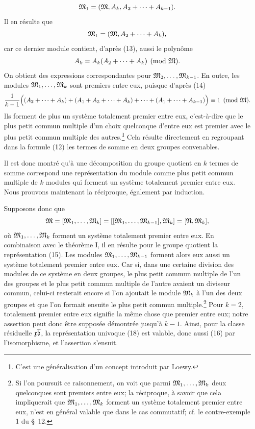 \[
 \mathfrak{M}_1=(\mathfrak{M},A_k,A_2+\cdots+A_{k-1}).
\]
Il en résulte que
\[
 \mathfrak{M}_1=(\mathfrak{M},A_2+\cdots+A_k),
\]
car ce dernier module contient, d'après (13), aussi le polynôme
\[
 A_k=A_k(A_2+\cdots+A_k)\pmod{\mathfrak{M}}.
\]
On obtient des expressions correspondantes pour $\mathfrak{M}_2,\ldots,\mathfrak{M}_{k-1}$. En outre, les modules $\mathfrak{M}_1,\ldots,\mathfrak{M}_k$ sont premiers entre eux, puisque d'après (14)
\[
 \frac{1}{k-1}\Bigl((A_2+\cdots+A_k)+(A_1+A_3+\cdots+A_k)+\cdots+(A_1+\cdots+A_{k-1})\Bigr)\equiv1\pmod{\mathfrak{M}}.
\]
Ils forment de plus un système totalement premier entre eux, c'est-à-dire que le plus petit commun multiple d'un choix quelconque d'entre eux est premier avec le plus petit commun multiple des autres.\footnote{C'est une généralisation d'un concept introduit par Loewy.} Cela résulte directement en regroupant dans la formule (12) les termes de somme en deux groupes convenables.

Il est donc montré qu'à une décomposition du groupe quotient en $k$ termes de somme correspond une représentation du module comme plus petit commun multiple de $k$ modules qui forment un système totalement premier entre eux. Nous prouvons maintenant la réciproque, également par induction.

Supposons donc que
\[
 \mathfrak{M}=[\mathfrak{M}_1,\ldots,\mathfrak{M}_k]=[[\mathfrak{M}_1,\ldots,\mathfrak{M}_{k-1}],\mathfrak{M}_k]=[\mathfrak{N},\mathfrak{M}_k],
\]
où $\mathfrak{M}_1,\ldots,\mathfrak{M}_k$ forment un système totalement premier entre eux. En combinaison avec le théorème I, il en résulte pour le groupe quotient la représentation (15). Les modules $\mathfrak{M}_1,\ldots,\mathfrak{M}_{k-1}$ forment alors eux aussi un système totalement premier entre eux. Car si, dans une certaine division des modules de ce système en deux groupes, le plus petit commun multiple de l'un des groupes et le plus petit commun multiple de l'autre avaient un diviseur commun, celui-ci resterait encore si l'on ajoutait le module $\mathfrak{M}_k$ à l'un des deux groupes et que l'on formait ensuite le plus petit commun multiple.\footnote{Si l'on poursuit ce raisonnement, on voit que parmi $\mathfrak{M}_1,\ldots,\mathfrak{M}_k$ deux quelconques sont premiers entre eux; la réciproque, à savoir que cela impliquerait que $\mathfrak{M}_1,\ldots,\mathfrak{M}_k$ forment un système totalement premier entre eux, n'est en général valable que dans le cas commutatif; cf. le contre-exemple 1 du \S~12.} Pour $k=2$, \og{}totalement premier entre eux\fg{} signifie la même chose que \og{}premier entre eux\fg{}; notre assertion peut donc être supposée démontrée jusqu'à $k-1$. Ainsi, pour la classe résiduelle $\mathfrak{x}\overline{\mathfrak{b}}$, la représentation univoque (18) est valable, donc aussi (16) par l'isomorphisme, et l'assertion s'ensuit.

